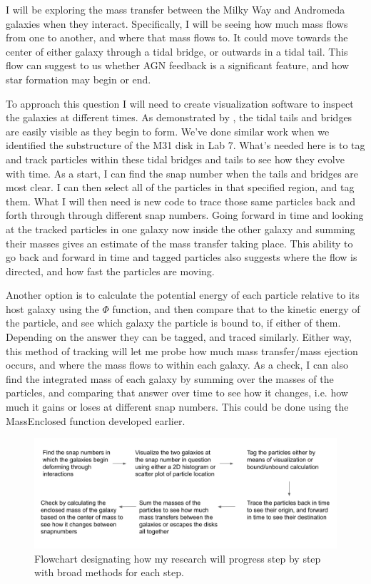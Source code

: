 \documentclass[linenumbers]{aastex631}
\begin{document}
I will be exploring the mass transfer between the Milky Way and Andromeda galaxies when they interact. Specifically, I will be seeing how much mass flows from one to another, and where that mass flows to. It could move towards the center of either galaxy through a tidal bridge, or outwards in a tidal tail. This flow can suggest to us whether AGN feedback is a significant feature, and how star formation may begin or end. 

To approach this question I will need to create visualization software to inspect the galaxies at different times. As demonstrated by \cite{toomre1972galactic}, the tidal tails and bridges are easily visible as they begin to form. We've done similar work when we identified the substructure of the M31 disk in Lab 7. What's needed here is to tag and track particles within these tidal bridges and tails to see how they evolve with time. As a start, I can find the snap number when the tails and bridges are most clear. I can then select all of the particles in that specified region, and tag them. What I will then need is new code to trace those same particles back and forth through through different snap numbers. Going forward in time and looking at the tracked particles in one galaxy now inside the other galaxy and summing their masses gives an estimate of the mass transfer taking place. This ability to go back and forward in time and tagged particles also suggests where the flow is directed, and how fast the particles are moving. 

Another option is to calculate the potential energy of each particle relative to its host galaxy using the $\Phi$ function, and then compare that to the kinetic energy of the particle, and see which galaxy the particle is bound to, if either of them. Depending on the answer they can be tagged, and traced similarly. Either way, this method of tracking will let me probe how much mass transfer/mass ejection occurs, and where the mass flows to within each galaxy. As a check, I can also find the integrated mass of each galaxy by summing over the masses of the particles, and comparing that answer over time to see how it changes, i.e. how much it gains or loses at different snap numbers. This could be done using the MassEnclosed function developed earlier.

    \begin{figure}[h!]
        \centering
        \includegraphics[scale = 0.4]{methodology.png}
        \caption{Flowchart designating how my research will progress step by step with broad methods for each step.}
        \label{fig:methodology}
    \end{figure}
\end{document}
